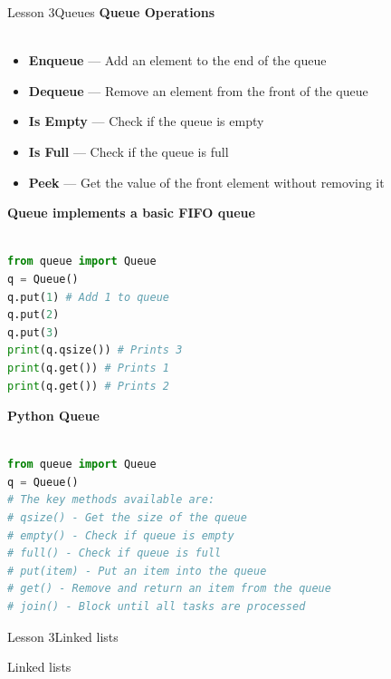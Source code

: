 \documentclass[aspectratio=1610]{beamer}
\begin{document}
\begin{frame}{Lesson 3}{Queues}
\LARGE
\textbf{Queue Operations}\\~\\
\Large
\begin{itemize}
\item \textbf{Enqueue} — Add an element to the end of the queue
\item \textbf{Dequeue} — Remove an element from the front of the queue
\item \textbf{Is Empty} — Check if the queue is empty
\item \textbf{Is Full} — Check if the queue is full
\item \textbf{Peek} — Get the value of the front element without removing it
\end{itemize}
\end{frame}




\begin{frame}[fragile]
\Large
\textbf{Queue implements a basic FIFO queue}\\~\\
\begin{lstlisting}[language=Python]
from queue import Queue
q = Queue()
q.put(1) # Add 1 to queue
q.put(2)
q.put(3)
print(q.qsize()) # Prints 3
print(q.get()) # Prints 1
print(q.get()) # Prints 2
\end{lstlisting}
\end{frame}



\begin{frame}[fragile]
\Large
\textbf{Python Queue}\\~\\
\begin{lstlisting}[language=Python]
from queue import Queue
q = Queue()
# The key methods available are:
# qsize() - Get the size of the queue
# empty() - Check if queue is empty
# full() - Check if queue is full
# put(item) - Put an item into the queue
# get() - Remove and return an item from the queue
# join() - Block until all tasks are processed
\end{lstlisting}
\end{frame}





\begin{frame}{Lesson 3}{Linked lists}
\begin{center}
\Huge Linked lists
\end{center}
\end{frame}
\end{document}
